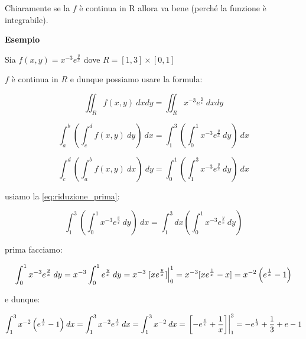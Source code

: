 \documentclass[../appunti-analisi.tex]{subfiles}
\begin{document}
Chiaramente se la $f$ è continua in R allora va bene (perché la funzione è integrabile).


\newpage 

\textbf{Esempio} 

Sia $f(x,y)= x^{-3} e ^{ \frac{y}{x}}$ dove $R = [1,3] \times [0,1]$

$f$ è continua in $R$ e dunque possiamo usare la formula:

\[
    \iint_R {f(x,y)} \: dx d y = \iint_R {x ^{-3} e ^{ \frac{y}{x}}} \: d x d y 
\]

\begin{equation}\label{eq:riduzione_prima}
    \int_{a}^{b} {\left(\int_{c}^{d} {f(x,y)} \: d y \right)} \: dx   = \int_{1}^{3} {\left(\int_{0}^{1} {x ^{-3} e ^{ \frac{y}{x}}} \: d y \right)} \: dx 
\end{equation}

\begin{equation}\label{eq:riduzione_seconda}
    \int_{c}^{d} {\left(\int_{a}^{b} {f(x,y)} \: dx \right)} \: d y  = \int_{0}^{1} {\left(\int_{1}^{3} {x ^{-3} e ^{ \frac{y}{x}}} \: d y \right)} \: dx 
\end{equation}

usiamo la \ref{eq:riduzione_prima}:

\[
\int_{1}^{3} {\left(\int_{0}^{1} {x ^{-3} e ^{ \frac{y}{x}}} \: d y \right)} \: dx  = \int_{1}^{3} {d x \left(\int_{0}^{1} {x ^{-3} e ^{ \frac{y}{x}}} \: dy \right)}
\]

prima facciamo:

\[
    \int_{0}^{1} {x ^{-3} e ^{ \frac{y}{x}}} \: d y = x ^{-3} \int_{0}^{1} { e ^{ \frac{y}{x}}} \: d y = x ^{-3} \left.[x e ^{ \frac{y}{x}}]\right\rvert_{0}^{1} = x ^{-3} [ x e ^{ \frac{1}{x}}-x ] = x ^{-2} \left(e ^{ \frac{1}{x}} -1\right)
\]

e dunque:

\[
    \int_{1}^{3} {x ^{-2} \left(e ^{ \frac{1}{x}}-1\right)} \: dx  = \int_{1}^{3} {x ^{-2} e ^{ \frac{1}{x}}} \: dx  = \int_{1}^{3} {x ^{-2}} \: dx  = \left.\left[ -e ^{ \frac{1}{x}} + \frac{1}{x}\right]\right\rvert_{1}^{3} = -e ^{ \frac{1}{3}} + \frac{1}{3} + e -1
\] 
\end{document}
